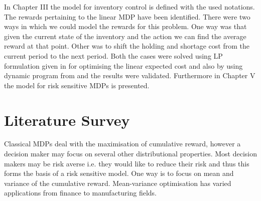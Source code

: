 \documentclass[11pt,a4paper,oneside]{report}
\begin{document}
In Chapter III the model for inventory control is defined with the used notations. The rewards pertaining to the linear MDP have been identified. There were two ways in which we could model the rewards for this problem. One way was that given the current state of the inventory and the action we can find the average reward at that point. Other was to shift the holding and shortage cost from the current period to the next period. Both the cases were solved using LP formulation given in \citep{kumar2015finite} for optimising the linear expected cost and also by using dynamic program from \citep{puterman1990market} and the results were validated. Furthermore in Chapter V the model for risk sensitive MDPs is presented.

\chapter{Literature Survey}


\noindent Classical MDPs deal with the maximisation of cumulative reward, however a decision maker may focus on several other distributional properties. Most decision makers may be risk averse i.e. they would like to reduce their risk and thus this forms the basis of a risk sensitive model. 
One way is to focus on mean and variance of the cumulative reward. Mean-variance optimisation has varied applications from finance to manufacturing fields.\\
\end{document}
